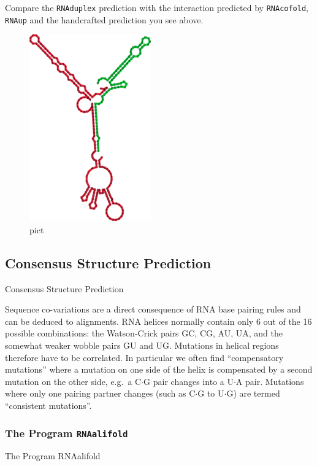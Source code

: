 \documentclass[]{article}
\begin{document}
Compare the \texttt{RNAduplex} prediction with the interaction predicted
by \texttt{RNAcofold}, \texttt{RNAup} and the handcrafted prediction you
see above.

\begin{figure}[htbp]
\centering
\includegraphics{Figs/OmpN_cofold.png}
\caption{pict}
\end{figure}

\subsection{Consensus Structure Prediction}{Consensus Structure Prediction}\label{consensus-structure-prediction}

Sequence co-variations are a direct consequence of RNA base pairing
rules and can be deduced to alignments. RNA helices normally contain
only 6 out of the 16 possible combinations: the Watson-Crick pairs GC,
CG, AU, UA, and the somewhat weaker wobble pairs GU and UG. Mutations in
helical regions therefore have to be correlated. In particular we often
find ``compensatory mutations'' where a mutation on one side of the helix
is compensated by a second mutation on the other side, e.g.~a
C\(\cdot\)G pair changes into a U\(\cdot\)A pair. Mutations where only
one pairing partner changes (such as C\(\cdot\)G to U\(\cdot\)G) are
termed ``consistent mutations''.

\subsubsection{The Program \texttt{RNAalifold}}{The Program RNAalifold}\label{the-program-rnaalifold}
\end{document}
